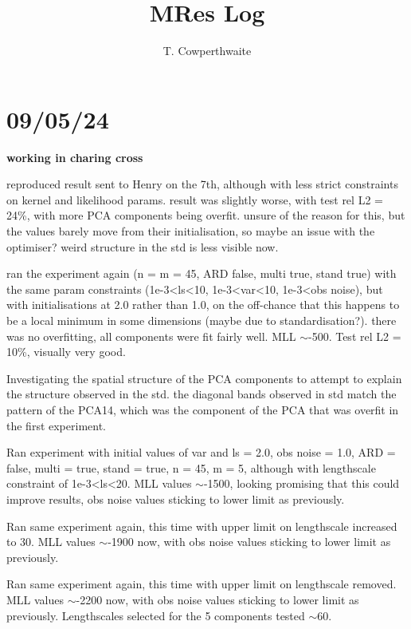 \documentclass[11pt,a4paper]{article}
\begin{document}
\title{MRes Log}
\author{T. Cowperthwaite}

\maketitle

\section{09/05/24}

\textbf{working in charing cross}

reproduced result sent to Henry on the 7th, although with less strict constraints on kernel and likelihood params. 
result was slightly worse, with test rel L2 = 24\%, with more PCA components being overfit.
unsure of the reason for this, but the values barely move from their initialisation, so maybe an issue with the optimiser?
weird structure in the std is less visible now.

ran the experiment again (n = m = 45, ARD false, multi true, stand true) with the same param constraints (1e-3\textless ls\textless10, 1e-3\textless var\textless 10, 1e-3\textless obs noise), but with initialisations at 2.0 rather than 1.0, on the off-chance that this happens to be a local minimum in some dimensions (maybe due to standardisation?).
there was no overfitting, all components were fit fairly well. 
MLL $\sim$-500.
Test rel L2 = 10\%, visually very good.

Investigating the spatial structure of the PCA components to attempt to explain the structure observed in the std.
the diagonal bands observed in std match the pattern of the PCA14, which was the component of the PCA that was overfit in the first experiment.

Ran experiment with initial values of var and ls = 2.0, obs noise = 1.0, ARD = false, multi = true, stand = true, n = 45, m = 5, although with lengthscale constraint of 1e-3\textless ls\textless20.
MLL values $\sim$-1500, looking promising that this could improve results, obs noise values sticking to lower limit as previously.

Ran same experiment again, this time with upper limit on lengthscale increased to 30.
MLL values $\sim$-1900 now, with obs noise values sticking to lower limit as previously.

Ran same experiment again, this time with upper limit on lengthscale removed.
MLL values $\sim$-2200 now, with obs noise values sticking to lower limit as previously.
Lengthscales selected for the 5 components tested $\sim$60.
\end{document}
